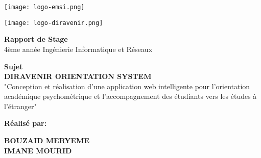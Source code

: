 \documentclass[12pt,a4paper]{report}
\begin{document}
\begin{titlepage}
    \centering
        
       \begin{minipage}[t]{6cm}
            \centering
            \vspace{0.1cm}
        \texttt{[image: logo-emsi.png]}\\
        \end{minipage}
        \hfill
    \begin{minipage}[t]{6cm}
            \centering
        \vspace{-0.3cm}
        \texttt{[image: logo-diravenir.png]}\\
        \end{minipage}
        
    {\Large\bfseries Rapport de Stage}\\[0.2cm]
    {\large 4ème année Ingénierie Informatique et Réseaux}\\[0.2cm]
    
    \vspace{2cm}
    
    {\huge\bfseries Sujet}\\[0.8cm]
    {\LARGE\bfseries DIRAVENIR ORIENTATION SYSTEM}\\[0.4cm]
    {\large "Conception et réalisation d'une application web intelligente pour l'orientation académique psychométrique et l'accompagnement des étudiants vers les études à l'étranger"}\\[2cm]
    
    \vspace{1cm}
        
        \begin{minipage}{0.45\textwidth}
        \begin{flushleft}
            \large\bfseries Réalisé par:
        \end{flushleft}
    \end{minipage}
    
    \vspace{0.4cm}
    
        \begin{minipage}{0.45\textwidth}
        \begin{flushleft}
        \large\bfseries BOUZAID MERYEME\\
        \large\bfseries IMANE MOURID
        \end{flushleft}
    \end{minipage}
    

\end{titlepage}
\end{document}
